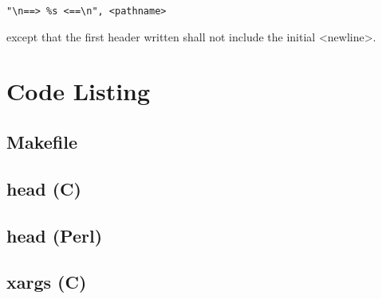 \documentclass[en, listings]{labreport}
\begin{document}
\begin{verbatim}
"\n==> %s <==\n", <pathname>
\end{verbatim}

\noindent
except that the first header written shall not include the initial <newline>.

\section*{Code Listing}

\setmonofont{Fira Mono}

\subsection*{Makefile}



\subsection*{head (C)}



\subsection*{head (Perl)}



\subsection*{xargs (C)}


\end{document}

